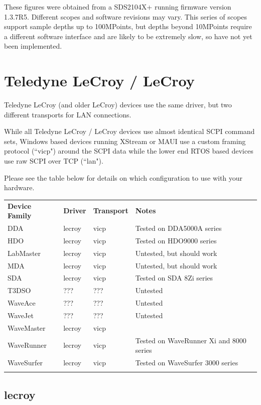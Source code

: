 These figures were obtained from a SDS2104X+ running firmware version 1.3.7R5. Different scopes and software
revisions may vary. This series of scopes support sample depths up to 100MPoints, but depths beyond 10MPoints
require a different software interface and are likely to be extremely slow, so have not yet been implemented.

\section{Teledyne LeCroy / LeCroy}

Teledyne LeCroy (and older LeCroy) devices use the same driver, but two different transports for LAN connections.

While all Teledyne LeCroy / LeCroy devices use almost identical SCPI command sets, Windows based devices running
XStream or MAUI use a custom framing protocol (``vicp") around the SCPI data while the lower end RTOS based devices use
raw SCPI over TCP (``lan").

Please see the table below for details on which configuration to use with  your hardware.

\begin{tabularx}{16cm}{lllX}
\thickhline
\textbf{Device Family} & \textbf{Driver} & \textbf{Transport} & \textbf{Notes} \\
\thickhline
DDA & lecroy & vicp & Tested on DDA5000A series \\
\thickhline
HDO & lecroy & vicp & Tested on HDO9000 series \\
\thickhline
LabMaster & lecroy & vicp & Untested, but should work\\
\thickhline
MDA & lecroy & vicp & Untested, but should work\\
\thickhline
SDA & lecroy & vicp & Tested on SDA 8Zi series\\
\thickhline
T3DSO & ??? & ??? & Untested\\
\thickhline
WaveAce & ??? & ??? & Untested\\
\thickhline
WaveJet & ??? & ??? & Untested\\
\thickhline
WaveMaster & lecroy & vicp & \\
\thickhline
WaveRunner & lecroy & vicp & Tested on WaveRunner Xi and 8000 series\\
\thickhline
WaveSurfer & lecroy & vicp & Tested on WaveSurfer 3000 series \\
\thickhline
\end{tabularx}

\subsection{lecroy}

